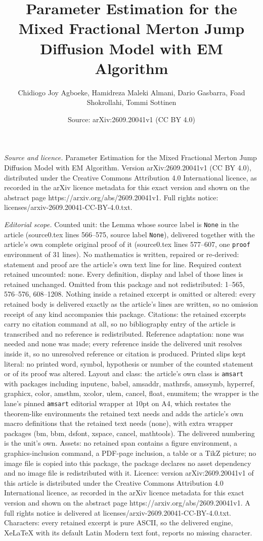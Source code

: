 \documentclass[10pt,a4paper]{amsart}
\title[Parameter Estimation for the Mixed Fractional Merton Jump Di]{Parameter Estimation for the Mixed Fractional Merton Jump Diffusion Model with EM Algorithm}
\author{Chidiogo Joy Agboeke, Hamidreza Maleki Almani, Dario Gasbarra, Foad Shokrollahi, Tommi Sottinen}
\date{Source: arXiv:2609.20041v1 (CC BY 4.0)}
\begin{document}
\maketitle

\noindent\emph{Source and licence.} Parameter Estimation for the Mixed Fractional Merton Jump Diffusion Model with EM Algorithm. Version arXiv:2609.20041v1 (CC BY 4.0), distributed under the Creative Commons Attribution 4.0 International licence, as recorded in the arXiv licence metadata for this exact version and shown on the abstract page https://arxiv.org/abs/2609.20041v1. Full rights notice: licenses/arxiv-2609.20041-CC-BY-4.0.txt.\par\smallskip

\noindent\textit{Editorial scope.} Counted unit: the Lemma whose source label is \texttt{None} in the article (source0.tex lines 566--575, source label \texttt{None}), delivered together with the article's own complete original proof of it (source0.tex lines 577--607, one \texttt{proof} environment of 31 lines). No mathematics is written, repaired or re-derived: statement and proof are the article's own text line for line. Required context retained uncounted: none. Every definition, display and label of those lines is retained unchanged. Omitted from this package and not redistributed: 1--565, 576--576, 608--1208. Nothing inside a retained excerpt is omitted or altered: every retained body is delivered exactly as the article's lines are written, so no omission receipt of any kind accompanies this package. Citations: the retained excerpts carry no citation command at all, so no bibliography entry of the article is transcribed and no reference is redistributed. Reference adaptation: none was needed and none was made; every reference inside the delivered unit resolves inside it, so no unresolved reference or citation is produced. Printed slips kept literal: no printed word, symbol, hypothesis or number of the counted statement or of its proof was altered. Layout and class: the article's own class is \texttt{amsart} with packages including inputenc, babel, amsaddr, mathrsfs, amssymb, hyperref, graphicx, color, amsthm, xcolor, ulem, cancel, float, enumitem; the wrapper is the lane's pinned \texttt{amsart} editorial wrapper at 10pt on A4, which restates the theorem-like environments the retained text needs and adds the article's own macro definitions that the retained text needs (none), with extra wrapper packages (bm, bbm, dsfont, xspace, cancel, mathtools). The delivered numbering is the unit's own. Assets: no retained span contains a figure environment, a graphics-inclusion command, a PDF-page inclusion, a table or a TikZ picture; no image file is copied into this package, the package declares no asset dependency and no image file is redistributed with it. Licence: version arXiv:2609.20041v1 of this article is distributed under the Creative Commons Attribution 4.0 International licence, as recorded in the arXiv licence metadata for this exact version and shown on the abstract page https://arxiv.org/abs/2609.20041v1. A full rights notice is delivered at licenses/arxiv-2609.20041-CC-BY-4.0.txt. Characters: every retained excerpt is pure ASCII, so the delivered engine, XeLaTeX with its default Latin Modern text font, reports no missing character.
\end{document}
